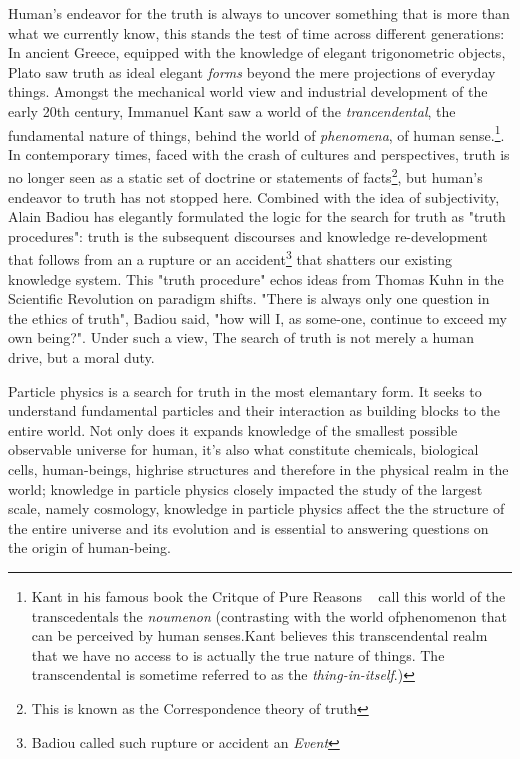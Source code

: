 Human's endeavor for the truth is always to uncover something that is more than what we currently know, this stands the test of time across different generations: In ancient Greece, equipped with the knowledge of elegant trigonometric objects, Plato saw truth as ideal elegant \textit{forms} beyond the mere projections of everyday things. Amongst the mechanical world view and industrial development of the early 20th century, Immanuel Kant saw a world of the \textit{trancendental}, the fundamental
nature of things, behind the world of \textit{phenomena}, of human sense.\footnote{Kant in his famous book the Critque of Pure Reasons ~\cite{} call this world of the transcedentals the \textit{noumenon} (contrasting with the world
ofphenomenon that can be perceived by human senses.Kant believes this transcendental realm that we have no access to is actually the true nature of things. The transcendental is sometime referred to as the \textit{thing-in-itself}.)}. In contemporary times, faced with the crash of cultures and perspectives, truth is no longer seen as a static set of doctrine or statements of facts\footnote{This is known as the Correspondence theory of truth}, but human's endeavor to truth has not stopped here.
Combined with the idea of subjectivity, Alain Badiou has elegantly formulated the logic for the search for truth as "truth procedures": truth is the subsequent discourses and knowledge re-development that follows from an a rupture or an accident\footnote{Badiou called such rupture or accident an \textit{Event}} that shatters our existing knowledge system. This "truth procedure" echos ideas from Thomas Kuhn in the Scientific Revolution on paradigm shifts. "There is always only one question in the ethics of truth", Badiou said, "how will I, as some-one, continue to exceed my own being?"\cite{Ethics: An Essay on the Understanding of Evil}. Under such a view, The search of truth is not merely a human drive, but a moral duty.


Particle physics is a search for truth in the most elemantary form. It seeks to understand fundamental particles and their interaction as building blocks to the entire world. Not only does it expands knowledge of the smallest possible observable universe for human, it's also what constitute chemicals, biological cells, human-beings, highrise structures and therefore  in the physical realm in the world; knowledge in particle physics closely impacted the study of the largest scale, namely cosmology, knowledge in particle physics affect the the structure of the entire universe and its evolution and is essential to answering questions on the origin of human-being.

